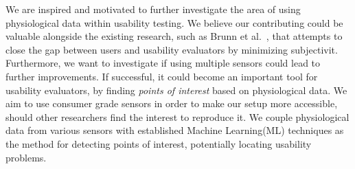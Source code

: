 We are inspired and motivated to further investigate the area of using physiological data within usability testing. We
believe our contributing could be valuable alongside the existing research, such as Brunn et al.~\cite{LH-paper}, that
attempts to close the gap between users and usability evaluators by minimizing subjectivit. Furthermore, we want to
investigate if using multiple sensors could lead to further improvements.
If successful, it could become an important tool for usability evaluators, by finding \textit{points of interest} based on physiological data. 
We aim to use consumer grade sensors in order to make our setup more accessible, should other researchers find the interest to reproduce
it. We couple physiological data from various sensors with established Machine Learning(ML) techniques as the method for
detecting points of interest, potentially locating usability problems.